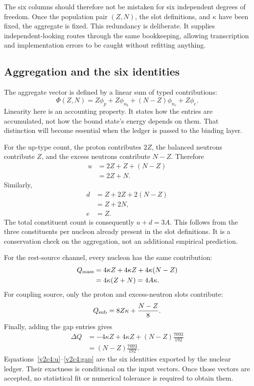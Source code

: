 The six columns should therefore not be mistaken for six independent degrees of freedom. Once the population pair $(Z,N)$, the slot definitions, and $\kappa$ have been fixed, the aggregate is fixed. This redundancy is deliberate. It supplies independent-looking routes through the same bookkeeping, allowing transcription and implementation errors to be caught without refitting anything.

\subsection{Aggregation and the six identities}
\label{v2c4:aggregate}

The aggregate vector is defined by a linear sum of typed contributions:
\begin{equation}
 \Phi(Z,N)=Z\phi_p+Z\phi_{n_b}
 +(N-Z)\phi_{n_e}+Z\phi_e.
 \label{v2c4:aggregatevector}
\end{equation}
Linearity here is an accounting property. It states how the entries are accumulated, not how the bound state's energy depends on them. That distinction will become essential when the ledger is passed to the binding layer.

For the up-type count, the proton contributes $2Z$, the balanced neutrons contribute $Z$, and the excess neutrons contribute $N-Z$. Therefore
\begin{align}
 u&=2Z+Z+(N-Z)\nonumber\\
  &=2Z+N.
 \label{v2c4:u}
\end{align}
Similarly,
\begin{align}
 d&=Z+2Z+2(N-Z)\nonumber\\
  &=Z+2N,
 \label{v2c4:d}\\
 e&=Z.
 \label{v2c4:e}
\end{align}
The total constituent count is consequently $u+d=3A$. This follows from the three constituents per nucleon already present in the slot definitions. It is a conservation check on the aggregation, not an additional empirical prediction.

For the rest-source channel, every nucleon has the same contribution:
\begin{align}
 Q_{\rm mass}
 &=4\kappa Z+4\kappa Z+4\kappa(N-Z)\nonumber\\
 &=4\kappa(Z+N)=4A\kappa.
 \label{v2c4:qmass}
\end{align}
For coupling source, only the proton and excess-neutron slots contribute:
\begin{equation}
 Q_{\rm sub}=8Z\kappa+\frac{N-Z}{8}.
 \label{v2c4:qsub}
\end{equation}
Finally, adding the gap entries gives
\begin{align}
 \Delta Q&=-4\kappa Z+4\kappa Z
 +(N-Z)\frac{7093}{192}\nonumber\\
 &=(N-Z)\frac{7093}{192}.
 \label{v2c4:gap}
\end{align}
Equations~\eqref{v2c4:u}--\eqref{v2c4:gap} are the six identities exported by the nuclear ledger. Their exactness is conditional on the input vectors. Once those vectors are accepted, no statistical fit or numerical tolerance is required to obtain them.

